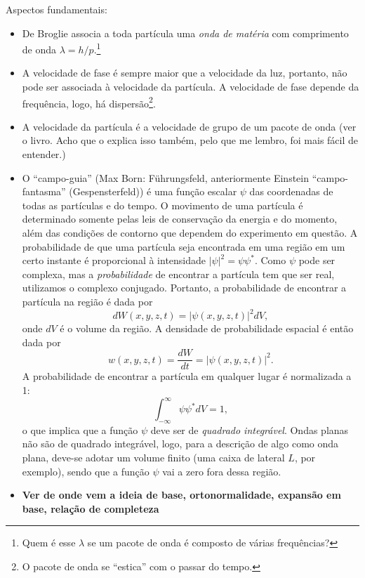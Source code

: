 Aspectos fundamentais\cite{GreinerQM}:
\begin{itemize}
	\item De Broglie associa a toda partícula uma \emph{onda de matéria} com comprimento de onda $\lambda = h / p$.\footnote{Quem é esse $\lambda$ se um pacote de onda é composto de várias frequências?}
	\item A velocidade de fase é sempre maior que a velocidade da luz, portanto, não pode ser associada à velocidade da partícula. A velocidade de fase depende da frequência, logo, há dispersão\footnote{O pacote de onda se ``estica'' com o passar do tempo.}.
	\item A velocidade da partícula é a velocidade de grupo de um pacote de onda (ver o livro. Acho que o \cite{Cohen} explica isso também, pelo que me lembro, foi mais fácil de entender.)
	\item O ``campo-guia'' (Max Born: Führungsfeld, anteriormente Einstein ``campo-fantasma'' (Gespensterfeld)) é uma função escalar $\psi$ das coordenadas de todas as partículas e do tempo. O movimento de uma partícula é determinado somente pelas leis de conservação da energia e do momento, além das condições de contorno que dependem do experimento em questão. A probabilidade de que uma partícula seja encontrada em uma região em um certo instante é proporcional à intensidade $|\psi|^2 = \psi\psi^*$. Como $\psi$ pode ser complexa, mas a \emph{probabilidade} de encontrar a partícula tem que ser real, utilizamos o complexo conjugado. Portanto, a probabilidade de encontrar a partícula na região é dada por
\begin{equation}
	dW(x, y, z, t) = |\psi(x, y, z, t)|^2 dV,
\end{equation}
%
onde $dV$ é o volume da região. A densidade de probabilidade espacial é então dada por
\begin{equation}
	w(x, y, z, t) = \frac{dW}{dt} = |\psi(x, y, z, t)|^2.
\end{equation}
%
A probabilidade de encontrar a partícula em qualquer lugar é normalizada a 1:
\begin{equation}
	\int_{-\infty}^\infty \psi\psi^* dV = 1,
\end{equation}
%
o que implica que a função $\psi$ deve ser de \emph{quadrado integrável}. Ondas planas não são de quadrado integrável, logo, para a descrição de algo como onda plana, deve-se adotar um volume finito (uma caixa de lateral $L$, por exemplo), sendo que a função $\psi$ vai a zero fora dessa região.
	\item \textbf{Ver de onde vem a ideia de base, ortonormalidade, expansão em base, relação de completeza}

\end{itemize}
